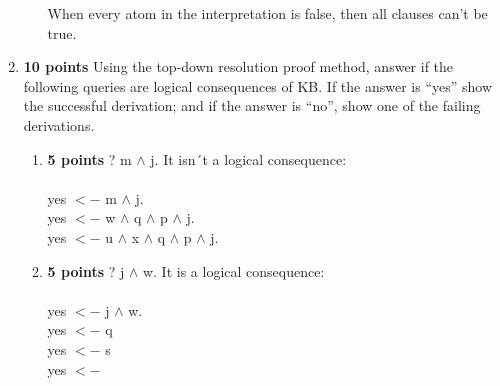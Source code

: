 \documentclass{article}
\def\ans#1{{\color{ans}#1}}
\begin{document}
\begin{enumerate}[label=(\alph*)]
\begin{enumerate}[label=\roman*.]
                \ans{
          When every atom in the interpretation is false, then all clauses can't be true.
      }  \\
        
    \end{enumerate}
    \item \textbf{10 points} Using the top-down resolution proof method, answer if the following queries are logical consequences of KB. If the answer is “yes” show the successful derivation; and if the answer is “no”, show one of the failing derivations.
    \begin{enumerate}[label=\roman*.]
        \item \textbf{5 points} ? m $\wedge$ j.
        \ans{
          It isn´t a logical consequence: \\ \\
          yes $<-$ m $\wedge$ j. \\
          yes $<-$ w $\wedge$ q $\wedge$ p $\wedge$ j. \\
          yes $<-$ u $\wedge$ x $\wedge$ q $\wedge$ p  $\wedge$ j.
      }  \\
        
        \item \textbf{5 points} ? j $\wedge$ w.
        \ans{
          It is a logical consequence: \\ \\
          yes $<-$ j $\wedge$ w. \\
          yes $<-$ q \\
          yes $<-$ s \\
          yes $<-$ 
      }  \\
    \end{enumerate}
\end{enumerate}

\clearpage
\end{document}
